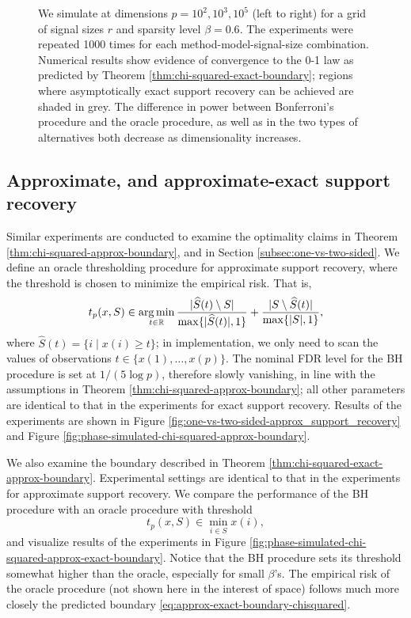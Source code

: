 \begin{figure}
{      We simulate at dimensions $p=10^2, 10^3, 10^5$ (left to right) for a grid of signal sizes $r$ and sparsity level $\beta=0.6$.
      The experiments were repeated 1000 times for each method-model-signal-size combination. 
      Numerical results show evidence of convergence to the 0-1 law as predicted by Theorem \ref{thm:chi-squared-exact-boundary}; regions where asymptotically exact support recovery can be achieved are shaded in grey.
      The difference in power between Bonferroni's procedure and the oracle procedure, as well as in the two types of alternatives both decrease as dimensionality increases.} 
      \label{fig:one-vs-two-sided-exact_support_recovery}
\end{figure}

\subsection{Approximate, and approximate-exact support recovery}

Similar experiments are conducted to examine the optimality claims in Theorem \ref{thm:chi-squared-approx-boundary}, and in Section \ref{subsec:one-vs-two-sided}.
We define an oracle thresholding procedure for approximate support recovery, where the threshold is chosen to minimize the empirical risk.
That is,
$$
t_p(x, S) \in \operatorname*{arg\,min}_{t\in\mathbb R} \frac{|\widehat{S}(t)\setminus S|}{\max\{|\widehat{S}(t)|,1\}} + \frac{|S\setminus \widehat{S}(t)|}{\max\{|{S}|,1\}},
$$
where $\widehat{S}(t) = \{i\;|\;x(i)\ge t\}$;
in implementation, we only need to scan the values of observations $t\in\{x(1), \ldots, x(p)\}$. 
The nominal FDR level for the BH procedure is set at $1/(5{\log{p}})$, therefore slowly vanishing, in line with the assumptions in Theorem \ref{thm:chi-squared-approx-boundary}; all other parameters are identical to that in the experiments for exact support recovery.
Results of the experiments are shown in Figure \ref{fig:one-vs-two-sided-approx_support_recovery} and Figure \ref{fig:phase-simulated-chi-squared-approx-boundary}.

We also examine the boundary described in Theorem \ref{thm:chi-squared-exact-approx-boundary}.
Experimental settings are identical to that in the experiments for approximate support recovery.
We compare the performance of the BH procedure with an oracle procedure with threshold
$$
t_p(x, S) \in \min_{i\in S} x(i),
$$
and visualize results of the experiments in Figure \ref{fig:phase-simulated-chi-squared-approx-exact-boundary}.
Notice that the BH procedure sets its threshold somewhat higher than the oracle, especially for small $\beta$'s. 
The empirical risk of the oracle procedure (not shown here in the interest of space) follows much more closely the predicted boundary \eqref{eq:approx-exact-boundary-chisquared}.

